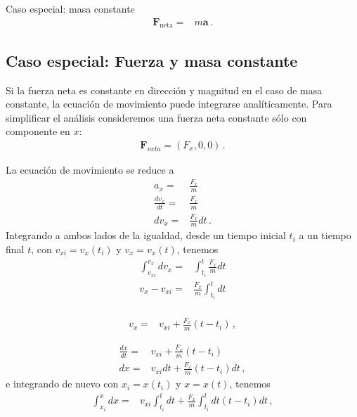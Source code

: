 \begin{frame}
  \begin{block}%
{Caso especial: masa constante}
\begin{align}
   \mathbf{F}_{\text{neta}}=&m\mathbf{a}\,.
\end{align}
\end{block}
\end{frame}

\subsection{Caso especial: Fuerza y masa constante}

Si la fuerza neta es constante en dirección y magnitud en el caso de masa constante, la ecuación de movimiento puede integrarse analíticamente. Para simplificar el análisis consideremos una fuerza neta constante sólo con componente en $x$:
\begin{align}
  \mathbf{F}_{neta}=(F_x,0,0)\,.
\end{align}

La ecuación de movimiento se reduce a
\begin{align}
  a_x=&\frac{F_x}{m}\nonumber\\
\frac{dv_x}{dt}=&\frac{F_x}{m}\nonumber\\
{dv_x}=&\frac{F_x}{m}{dt}\,.
\end{align}
Integrando a ambos lados de la igualdad, desde un tiempo inicial $t_i$ a un tiempo final $t$, con $v_{xi}=v_x(t_i)$ y $v_x=v_x(t)$, tenemos
\begin{align}
  \int_{v_{xi}}^{v_x} d v_x =&\int_{t_i}^t \frac{F_x}{m}{dt}\nonumber\\
  v_x-v_{xi} =&\frac{F_x}{m}\int_{t_i}^t {dt}\nonumber\\
\end{align}

\begin{align}
  \label{eq:36}
  v_x =&v_{xi}+\frac{F_x}{m}(t-t_i)\,,
\end{align}

\begin{align}
  \frac{dx}{dt} =&v_{xi}+\frac{F_x}{m}(t-t_i)\nonumber\\
  {dx} =&v_{xi}{dt}+\frac{F_x}{m}(t-t_i){dt}\,,
\end{align}
e integrando de nuevo con $x_i=x(t_i)$ y $x=x(t)$, tenemos
\begin{align}
  \int_{x_i}^{x}{dx} =&v_{xi}\int_{t_i}^t{dt}+\frac{F_x}{m}\int_{t_i}^t{dt}(t-t_i){dt}\,,
\end{align}

